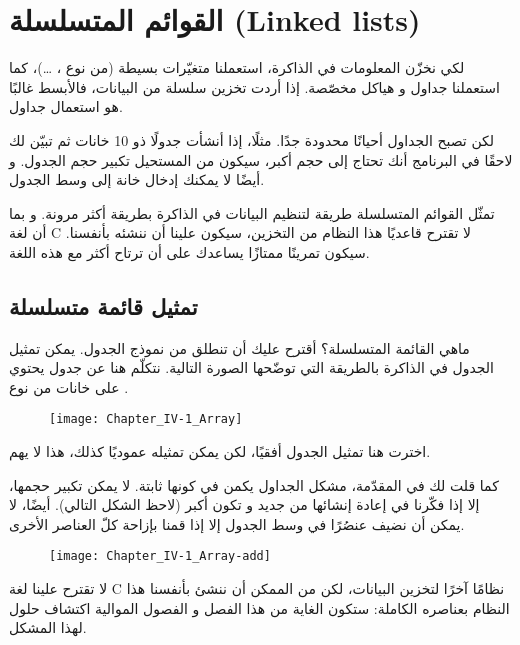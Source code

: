 \chapter{القوائم المتسلسلة (\textenglish{Linked lists})}

لكي نخزّن المعلومات في الذاكرة، استعملنا متغيّرات بسيطة (من نوع
، \dots)،
كما استعملنا جداول و هياكل مخصّصة. إذا أردت تخزين سلسلة من البيانات، فالأبسط غالبًا هو استعمال جداول. 

لكن تصبح الجداول أحيانًا محدودة جدًا. مثلًا، إذا أنشأت جدولًا ذو 10 خانات ثم تبيّن لك لاحقًا في البرنامج أنك تحتاج إلى حجم أكبر، سيكون من المستحيل تكبير حجم الجدول. و أيضًا لا يمكنك إدخال خانة إلى وسط الجدول.

تمثّل القوائم المتسلسلة طريقة لتنظيم البيانات في الذاكرة بطريقة أكثر مرونة. و بما أن لغة \textenglish{C}
لا تقترح قاعديًا هذا النظام من التخزين، سيكون علينا أن ننشئه بأنفسنا. سيكون تمرينًا ممتازًا يساعدك على أن ترتاح أكثر مع هذه اللغة.

\section{تمثيل قائمة متسلسلة}

ماهي القائمة المتسلسلة؟ أقترح عليك أن تنطلق من نموذج الجدول. يمكن تمثيل الجدول في الذاكرة بالطريقة التي توضّحها الصورة التالية. نتكلّم هنا عن جدول يحتوي على خانات من نوع
.

\begin{figure}[H]
	\centering
	\texttt{[image: Chapter\_IV-1\_Array]}
\end{figure}

\begin{information}
اخترت هنا تمثيل الجدول أفقيًا، لكن يمكن تمثيله عموديًا كذلك، هذا لا يهم.
\end{information}


كما قلت لك في المقدّمة، مشكل الجداول يكمن في كونها ثابتة. لا يمكن تكبير حجمها، إلا إذا فكّرنا في إعادة إنشائها من جديد و تكون أكبر (لاحظ الشكل التالي). أيضًا، لا يمكن أن نضيف عنصُرًا في وسط الجدول إلا إذا قمنا بإزاحة كلّ العناصر الأخرى.

\begin{figure}[H]
	\centering
	\texttt{[image: Chapter\_IV-1\_Array-add]}
\end{figure}

لا تقترح علينا لغة \textenglish{C}
نظامًا آخرًا لتخزين البيانات، لكن من الممكن أن ننشئ بأنفسنا هذا النظام بعناصره الكاملة: ستكون الغاية من هذا الفصل و الفصول الموالية اكتشاف حلول لهذا المشكل.

